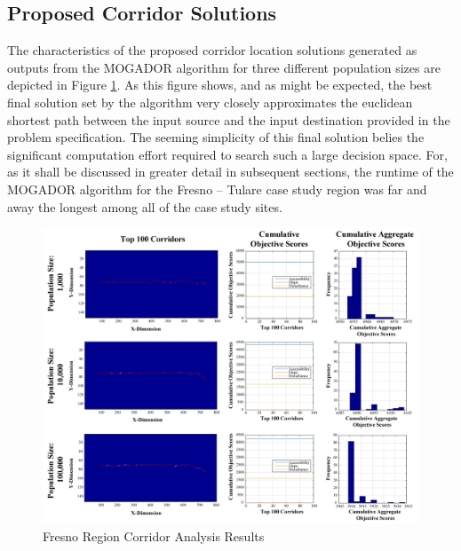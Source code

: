     \subsection{Proposed Corridor Solutions}
    
The characteristics of the proposed corridor location solutions generated as outputs from the MOGADOR algorithm for three different population sizes are depicted in Figure \ref{fig:Fresults}. As this figure shows, and as might be expected, the best final solution set by the algorithm very closely approximates the euclidean shortest path between the input source and the input destination provided in the problem specification. The seeming simplicity of this final solution belies the significant computation effort required to search such a large decision space. For, as it shall be discussed in greater detail in subsequent sections, the runtime of the MOGADOR algorithm for the Fresno -- Tulare case study region was far and away the longest among all of the case study sites. 
    
        \begin{figure}[!h]
            \begin{center}
            \includegraphics[width=6in]{figures/Fresno_PathwayResults.png}   
            \caption{Fresno Region Corridor Analysis Results}
            \label{fig:Fresults}
            \end{center}
        \end{figure}

